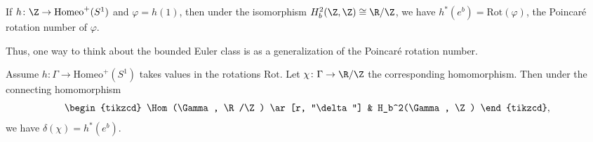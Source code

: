 \documentclass[a4paper]{article}
\newcommand\QH{\mathcal{QH}}
\newcommand\Homeo{\mathrm{Homeo}}
\newcommand\Rot{\mathrm{Rot}}
\begin{document}
\begin{ex}
  If $h\colon \Z \to \Homeo^+(S^1)$ and $\varphi = h(1)$, then under the isomorphism $H^2_b(\Z, \Z) \cong \R/\Z$, we have $h^*(e^b) = \Rot(\varphi)$, the Poincar\'e rotation number of $\varphi$.
\end{ex}
%
%
%
Thus, one way to think about the bounded Euler class is as a generalization of the Poincar\'e rotation number.

\begin{ex}
  Assume $h\colon \Gamma \to \Homeo^+(S^1)$ takes values in the rotations $\Rot$. Let $\chi\colon \Gamma \to \R/\Z$ the corresponding homomorphism. Then under the connecting homomorphism
  \[
    \begin{tikzcd}
      \Hom(\Gamma, \R/\Z) \ar[r, "\delta"] & H_b^2(\Gamma, \Z)
    \end{tikzcd},
  \]
  we have $\delta(\chi) = h^*(e^b)$.
\end{ex}
\end{document}
